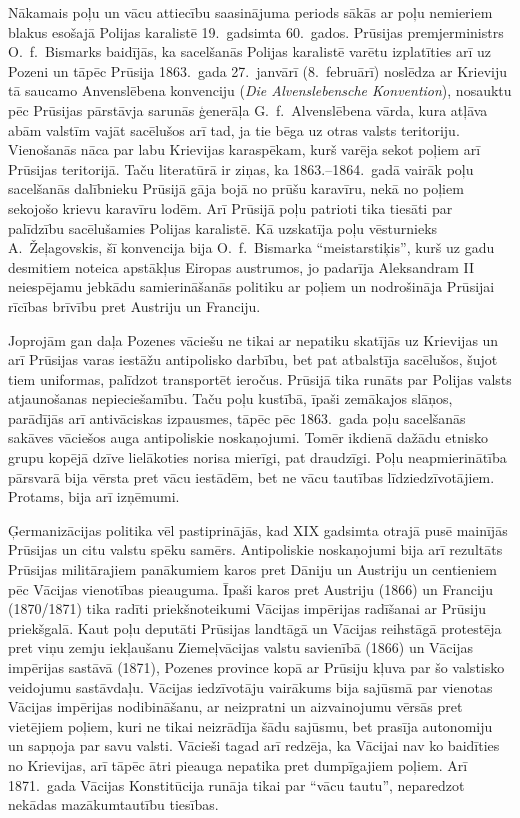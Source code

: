 \documentclass[twoside,a5paper,12pt,fleqn,openany]{extbook}
\newcommand{\detxti}[1]{\textit{\textgerman{#1}}}
\begin{document}
Nākamais poļu un vācu attiecību saasinājuma periods sākās ar poļu nemieriem blakus esošajā Polijas karalistē 19.~gadsimta 60.~gados. Prūsijas premjerministrs O.~f.~Bismarks baidījās, ka sacelšanās Polijas karalistē varētu izplatīties arī uz Pozeni un tāpēc Prūsija 1863.~gada 27.~janvārī (8.~februārī) noslēdza ar Krieviju tā saucamo Anvenslēbena konvenciju (\detxti{Die Alvenslebensche Konvention}), nosauktu pēc Prūsijas pārstāvja sarunās ģenerāļa G.~f.~Alvenslēbena vārda, kura atļāva abām valstīm vajāt sacēlušos arī tad, ja tie bēga uz otras valsts teritoriju. Vienošanās nāca par labu Krievijas karaspēkam, kurš varēja sekot poļiem arī Prūsijas teritorijā. Taču literatūrā ir ziņas, ka 1863.--1864.~gadā vairāk poļu sacelšanās dalībnieku Prūsijā gāja bojā no prūšu karavīru, nekā no poļiem sekojošo krievu karavīru lodēm. Arī Prūsijā poļu patrioti tika tiesāti par palīdzību sacēlušamies Polijas karalistē. Kā uzskatīja poļu vēsturnieks A.~Žeļagovskis, šī konvencija bija O.~f.~Bismarka ``meistarstiķis'', kurš uz gadu desmitiem noteica apstākļus Eiropas austrumos, jo padarīja Aleksandram II neiespējamu jebkādu samierināšanās politiku ar poļiem un nodrošināja Prūsijai rīcības brīvību pret Austriju un Franciju.

Joprojām gan daļa Pozenes vāciešu ne tikai ar nepatiku skatījās uz Krievijas un arī Prūsijas varas iestāžu antipolisko darbību, bet pat atbalstīja sacēlušos, šujot tiem uniformas, palīdzot transportēt ieročus. Prūsijā tika runāts par Polijas valsts atjaunošanas nepieciešamību. Taču poļu kustībā, īpaši zemākajos slāņos, parādījās arī antivāciskas izpausmes, tāpēc pēc 1863.~gada poļu sacelšanās sakāves vāciešos auga antipoliskie noskaņojumi. Tomēr ikdienā dažādu etnisko grupu kopējā dzīve lielākoties norisa mierīgi, pat draudzīgi. Poļu neapmierinātība pārsvarā bija vērsta pret vācu iestādēm, bet ne vācu tautības līdziedzīvotājiem. Protams, bija arī izņēmumi.

Ģermanizācijas politika vēl pastiprinājās, kad XIX gadsimta otrajā pusē mainījās Prūsijas un citu valstu spēku samērs. Antipoliskie noskaņojumi bija arī rezultāts Prūsijas militārajiem panākumiem karos pret Dāniju un Austriju un centieniem pēc Vācijas vienotības pieauguma. Īpaši karos pret Austriju (1866) un Franciju (1870/1871) tika radīti priekšnoteikumi Vācijas impērijas radīšanai ar Prūsiju priekšgalā. Kaut poļu deputāti Prūsijas landtāgā un Vācijas reihstāgā protestēja pret viņu zemju iekļaušanu Ziemeļvācijas valstu savienībā (1866) un Vācijas impērijas sastāvā (1871), Pozenes province kopā ar Prūsiju kļuva par šo valstisko veidojumu sastāvdaļu. Vācijas iedzīvotāju vairākums bija sajūsmā par vienotas Vācijas impērijas nodibināšanu, ar neizpratni un aizvainojumu vērsās pret vietējiem poļiem, kuri ne tikai neizrādīja šādu sajūsmu, bet prasīja autonomiju un sapņoja par savu valsti. Vācieši tagad arī redzēja, ka Vācijai nav ko baidīties no Krievijas, arī tāpēc ātri pieauga nepatika pret dumpīgajiem poļiem. Arī 1871.~gada Vācijas Konstitūcija runāja tikai par ``vācu tautu'', neparedzot nekādas mazākumtautību tiesības.
\end{document}
